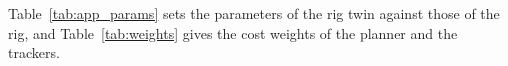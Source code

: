 Table~\ref{tab:app_params} sets the parameters of the rig twin against those of the rig, and
Table~\ref{tab:weights} gives the cost weights of the planner and the trackers.

